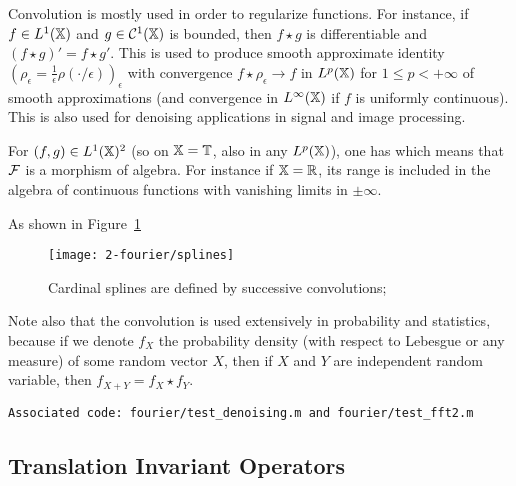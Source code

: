
Convolution is mostly used in order to regularize functions. For instance, if $f \in L^1(\mathbb{X})$ and $g \in \mathcal{C}^1(\mathbb{X})$ is bounded, then $f \star g$ is differentiable and $(f \star g)'=f \star g'$. This is used to produce smooth approximate identity $(\rho_\epsilon = \frac{1}{\epsilon}\rho(\cdot/\epsilon))_\epsilon$ with convergence $f \star \rho_\epsilon \rightarrow f$ in $L^p(\mathbb{X})$ for $1 \leq p < +\infty$ of smooth approximations (and convergence in $L^\infty(\mathbb{X})$ if $f$ is uniformly continuous). 
%
This is also used for denoising applications in signal and image processing.



For $(f,g) \in L^1(\mathbb{X})^2$ (so on $\mathbb{X}=\mathbb{T}$, also in any $L^p(\mathbb{X})$), one has
which means that $\mathcal{F}$ is a morphism of algebra. For instance if $\mathbb{X}=\mathbb{R}$, its range is included in the algebra of continuous functions with vanishing limits in $\pm\infty$.

As shown in Figure~\ref{fig-splines}

\begin{figure}
\centering
\texttt{[image: 2-fourier/splines]}
\caption{\label{fig-splines}
Cardinal splines are defined by successive convolutions;  
}
\end{figure}


Note also that the convolution is used extensively in probability and statistics, because if we denote $f_X$ the probability density (with respect to Lebesgue or any measure) of some random vector $X$, then if $X$ and $Y$ are independent random variable, then $f_{X+Y}=f_X \star f_Y$. 


\texttt{Associated code: fourier/test\_denoising.m and fourier/test\_fft2.m}

\subsection{Translation Invariant Operators}

